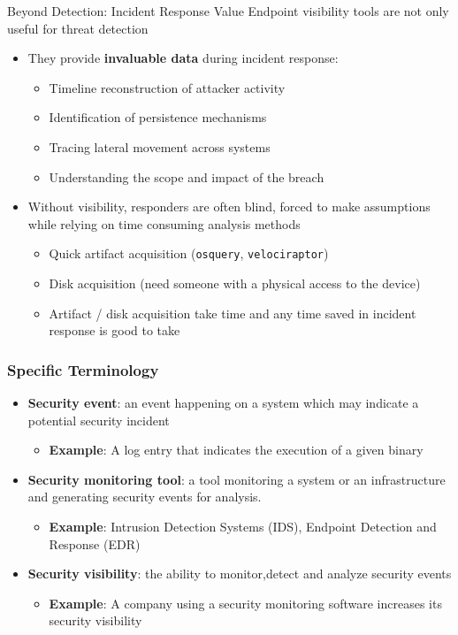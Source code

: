 \documentclass[12pt,aspectratio=169, colorlinks=true, linkcolor=circlBlue]{beamer}
\begin{document}
\begin{frame}{Beyond Detection: Incident Response Value}
	Endpoint visibility tools are not only useful for threat detection
	\begin{itemize}
		\item They provide \textbf{invaluable data} during incident response:
		      \begin{itemize}
			      \item Timeline reconstruction of attacker activity
			      \item Identification of persistence mechanisms
			      \item Tracing lateral movement across systems
			      \item Understanding the scope and impact of the breach
		      \end{itemize}
		\item Without visibility, responders are often blind, forced to make assumptions while relying on time consuming analysis methods
		      \begin{itemize}
			      \item Quick artifact acquisition (\texttt{osquery}, \texttt{velociraptor})
			      \item Disk acquisition (need someone with a physical access to the device)
			      \item Artifact / disk acquisition take time and any time saved in incident response is good to take
		      \end{itemize}
	\end{itemize}
\end{frame}

\begin{frame}
	\frametitle{Specific Terminology}
	\begin{itemize}
		\item \textbf{Security event}: an event happening on a system which may indicate a potential security incident
		      \begin{itemize}
			      \item[] \textbf{Example}: A log entry that indicates the execution of a given binary
		      \end{itemize}

		\item \textbf{Security monitoring tool}: a tool monitoring a system or an infrastructure and generating security events for analysis.
		      \begin{itemize}
			      \item[] \textbf{Example}: Intrusion Detection Systems (IDS), Endpoint Detection and Response (EDR)
		      \end{itemize}

		\item \textbf{Security visibility}: the ability to monitor,detect and analyze security events
		      \begin{itemize}
			      \item[] \textbf{Example}: A company using a security monitoring software increases its security visibility
		      \end{itemize}

	\end{itemize}
\end{frame}
\end{document}

